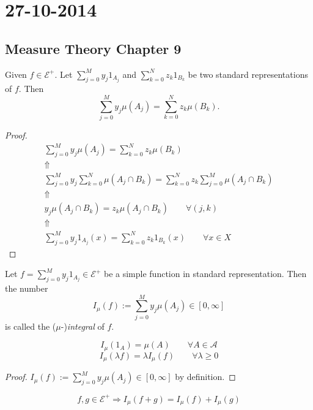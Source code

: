 \section{27-10-2014}
\subsection{Measure Theory Chapter 9}

\begin{prop}
Given \(f\in \mathcal{E}^+.\) Let \(\sum _{j=0}^My_{j}1_{A_{j}}\) and \(\sum _{k=0}^{N}z_{k}1_{B_{k}}\) be two standard representations of \(f\). Then
\[
\sum _{j=0}^My_{j}\mu (A_{j})=\sum _{k=0}^Nz_{k}\mu (B_{k}).
\]
\end{prop}

\begin{proof}
\begin{gather*}
\sum _{j=0}^My_{j}\mu (A_{j})=\sum _{k=0}^Nz_{k}\mu (B_{k}) \\
\Uparrow \\
\sum _{j=0}^My_{j} \sum _{k=0}^N\mu (A_{j}\cap B_{k})=\sum _{k=0}^Nz_{k} \sum _{j=0}^M\mu (A_{j}\cap B_{k})\\
\Uparrow  \\
y_{j}\mu (A_{j}\cap B_{k})=z_{k}\mu (A_{j}\cap B_{k}) \qquad \forall (j,k) \\
\Uparrow  \\
\sum _{j=0}^My_{j}1_{A_{j}}(x)=\sum _{k=0}^{N}z_{k}1_{B_{k}}(x) \qquad \forall x\in X
\end{gather*}
\end{proof}

\begin{defn}
Let \(f=\sum _{j=0}^My_{j}1_{A_{j}}\in \mathcal{E}^+\) be a simple function in standard representation. Then the number
\[
I_\mu (f):=\sum _{j=0}^My_{j}\mu (A_{j})\in [0,\infty ]
\]
is called the (\(\mu \)-)\emph{integral} of \(f\).
\end{defn}

\begin{prop}
\[
I_\mu (1_A)=\mu (A) \qquad \forall A\in \mathcal{A}
\]
\[
I_\mu (\lambda f)=\lambda I_\mu (f) \qquad \forall \lambda \geq 0
\]
\end{prop}

\begin{proof}
\(I_\mu (f):=\sum _{j=0}^My_{j}\mu (A_{j})\in [0,\infty ]\) by definition.
\end{proof}

\begin{prop}
\[
f,g\in \mathcal{E}^+ \Longrightarrow  I_\mu (f+g)=I_\mu (f)+I_\mu (g)
\]
\end{prop}

